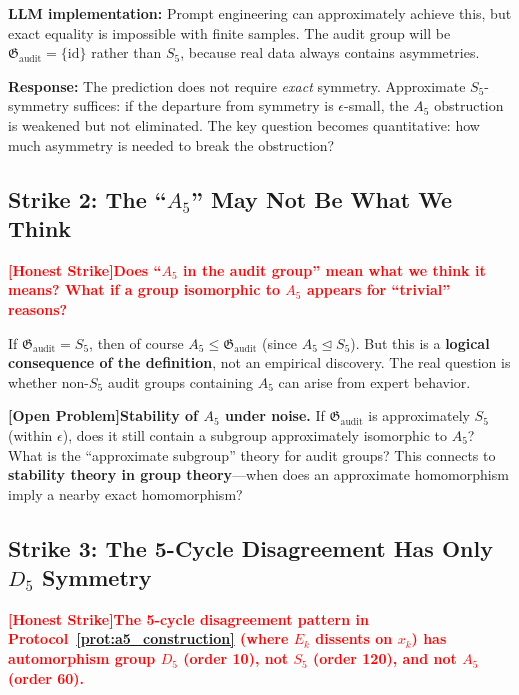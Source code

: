 \documentclass[12pt,a4paper]{article}
\theoremstyle{remark}
\newcommand{\Normal}{\trianglelefteq}
\newcommand{\AuditGrp}{\mathfrak{G}_{\mathrm{audit}}}
\newcommand{\honestcrit}[1]{%
    \textcolor{red}{\textbf{[Honest Strike]#1}}%
}
\newcommand{\openproblem}{\textnormal{\textbf{[Open Problem]}}}
\begin{document}
\textbf{LLM implementation:} Prompt engineering can approximately achieve this, but exact equality is impossible with finite samples. The audit group will be \(\AuditGrp = \{\mathrm{id}\}\) rather than \(S_5\), because real data always contains asymmetries.

\textbf{Response:} The prediction does not require \textit{exact} symmetry. Approximate \(S_5\)-symmetry suffices: if the departure from symmetry is \(\epsilon\)-small, the \(A_5\) obstruction is weakened but not eliminated. The key question becomes quantitative: how much asymmetry is needed to break the obstruction?

\begin{center}
\end{center}

\subsection{Strike 2: The ``\(A_5\)'' May Not Be What We Think}
\honestcrit{Does ``\(A_5\) in the audit group'' mean what we think it means? What if a group isomorphic to \(A_5\) appears for ``trivial'' reasons?}

If \(\AuditGrp = S_5\), then of course \(A_5 \leq \AuditGrp\) (since \(A_5 \Normal S_5\)). But this is a \textbf{logical consequence of the definition}, not an empirical discovery. The real question is whether non-\(S_5\) audit groups containing \(A_5\) can arise from expert behavior.

\openproblem \textbf{Stability of \(A_5\) under noise.}
If \(\AuditGrp\) is approximately \(S_5\) (within \(\epsilon\)), does it still contain a subgroup approximately isomorphic to \(A_5\)? What is the ``approximate subgroup'' theory for audit groups? This connects to \textbf{stability theory in group theory}---when does an approximate homomorphism imply a nearby exact homomorphism?

\subsection{Strike 3: The 5-Cycle Disagreement Has Only \(D_5\) Symmetry}
\honestcrit{The 5-cycle disagreement pattern in Protocol~\ref{prot:a5_construction} (where \(E_k\) dissents on \(x_k\)) has automorphism group \(D_5\) (order 10), not \(S_5\) (order 120), and not \(A_5\) (order 60).}
\end{document}
